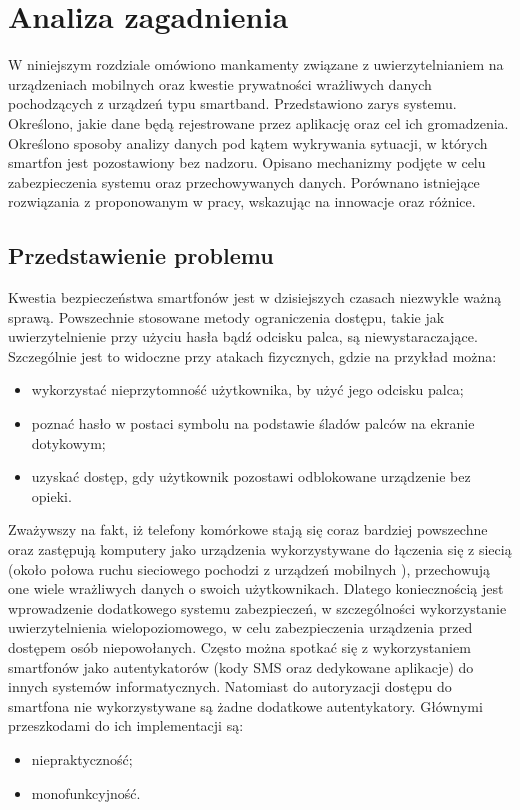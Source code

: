 \chapter{Analiza zagadnienia}
\thispagestyle{chapterBeginStyle}
\label{rozdzial1}
W niniejszym rozdziale omówiono mankamenty związane z uwierzytelnianiem na urządzeniach mobilnych oraz kwestie prywatności wrażliwych danych
pochodzących z urządzeń typu smartband. Przedstawiono zarys systemu. Określono, jakie dane będą rejestrowane
przez aplikację oraz cel ich gromadzenia. Określono sposoby analizy danych pod kątem wykrywania sytuacji, w których smartfon jest pozostawiony
bez nadzoru. Opisano mechanizmy podjęte w celu zabezpieczenia systemu oraz przechowywanych danych. Porównano istniejące rozwiązania z proponowanym w pracy,
wskazując na innowacje oraz różnice.

\section{Przedstawienie problemu}
Kwestia bezpieczeństwa smartfonów jest w dzisiejszych czasach niezwykle ważną sprawą. Powszechnie stosowane metody ograniczenia dostępu, takie
jak uwierzytelnienie przy użyciu hasła bądź odcisku palca, są niewystaraczające. Szczególnie jest to widoczne przy atakach fizycznych, gdzie na
przykład można:
\begin{itemize}
    \item wykorzystać nieprzytomność użytkownika, by użyć jego odcisku palca;
    \item poznać hasło w postaci symbolu na podstawie śladów palców na ekranie dotykowym;
    \item uzyskać dostęp, gdy użytkownik pozostawi odblokowane urządzenie bez opieki.
\end{itemize}

\indent Zważywszy na fakt, iż telefony komórkowe stają się coraz bardziej powszechne\cite{Smartphone-Users-W-wide} oraz zastępują komputery jako urządzenia wykorzystywane do łączenia się z
siecią (około połowa ruchu sieciowego pochodzi z urządzeń mobilnych \cite{Share-Of-Internet-Traffic-Mobile}), przechowują one wiele wrażliwych danych
o swoich użytkownikach. Dlatego koniecznością jest wprowadzenie dodatkowego systemu zabezpieczeń, w
szczególności wykorzystanie uwierzytelnienia wielopoziomowego, w celu zabezpieczenia urządzenia przed dostępem osób niepowołanych. Często można
spotkać się z wykorzystaniem smartfonów jako autentykatorów (kody SMS oraz dedykowane aplikacje) do innych systemów informatycznych.
Natomiast do autoryzacji dostępu do smartfona nie wykorzystywane są żadne dodatkowe autentykatory. Głównymi przeszkodami do ich implementacji są:
\begin{itemize}
    \item niepraktyczność;
    \item monofunkcyjność.
\end{itemize}

